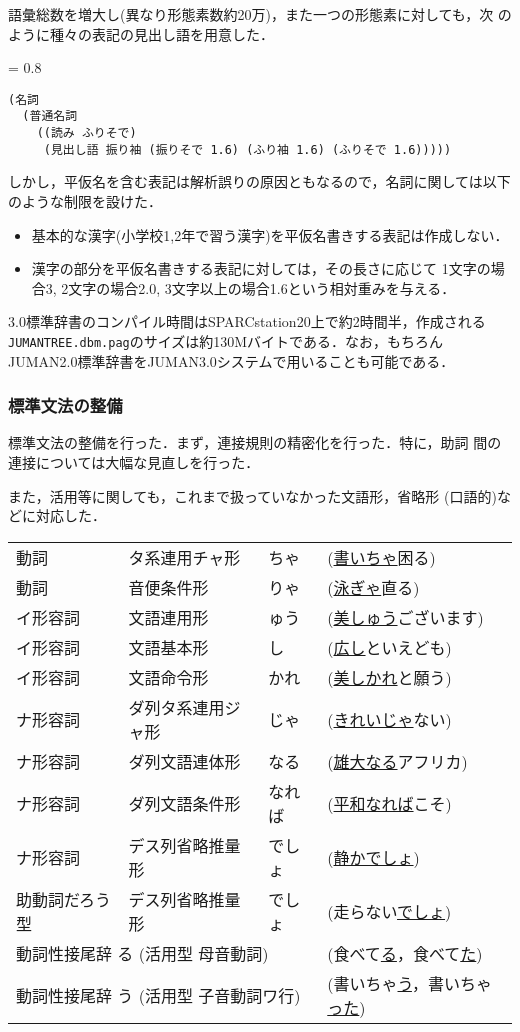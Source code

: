 \documentclass[a4j,titlepage]{jarticle}
\begin{document}
語彙総数を増大し(異なり形態素数約20万)，また一つの形態素に対しても，次
のように種々の表記の見出し語を用意した．
{\baselineskip = 0.8 \baselineskip
\begin{verbatim}
(名詞 
  (普通名詞 
    ((読み ふりそで)
     (見出し語 振り袖 (振りそで 1.6) (ふり袖 1.6) (ふりそで 1.6)))))
\end{verbatim}}

しかし，平仮名を含む表記は解析誤りの原因ともなるので，名詞に関しては以下
のような制限を設けた．
\begin{itemize}
\item 基本的な漢字(小学校1,2年で習う漢字)を平仮名書きする表記は作成しない．
\item 漢字の部分を平仮名書きする表記に対しては，その長さに応じて
  1文字の場合3, 2文字の場合2.0, 3文字以上の場合1.6という相対重みを与える．
\end{itemize}

3.0標準辞書のコンパイル時間はSPARCstation20上で約2時間半，作成される
{\tt JUMANTREE.dbm.pag}のサイズは約130Mバイトである．なお，もちろん
JUMAN2.0標準辞書をJUMAN3.0システムで用いることも可能である．

\subsubsection{標準文法の整備}

標準文法の整備を行った．まず，連接規則の精密化を行った．特に，助詞
間の連接については大幅な見直しを行った．

また，活用等に関しても，これまで扱っていなかった文語形，省略形
(口語的)などに対応した．
\begin{center}
\begin{tabular}{llll} \hline
動詞     & タ系連用チャ形 & ちゃ & (\underline{書いちゃ}困る) \\
動詞     & 音便条件形 & りゃ & (\underline{泳ぎゃ}直る) \\
イ形容詞 & 文語連用形 & ゅう & (\underline{美しゅう}ございます) \\
イ形容詞 & 文語基本形 & し & (\underline{広し}といえども) \\
イ形容詞 & 文語命令形 & かれ & (\underline{美しかれ}と願う) \\
ナ形容詞 & ダ列タ系連用ジャ形 & じゃ & (\underline{きれいじゃ}ない) \\
ナ形容詞 & ダ列文語連体形 & なる & (\underline{雄大なる}アフリカ) \\
ナ形容詞 & ダ列文語条件形 & なれば & (\underline{平和なれば}こそ) \\
ナ形容詞 & デス列省略推量形 & でしょ & (\underline{静かでしょ}) \\
助動詞だろう型  & デス列省略推量形 & でしょ & (走らない\underline{でしょ}) \\
\multicolumn{3}{l}{動詞性接尾辞 る (活用型 母音動詞)}  & (食べて\underline{る}，食べて\underline{た}) \\
\multicolumn{3}{l}{動詞性接尾辞 う (活用型 子音動詞ワ行)} & (書いちゃ\underline{う}，書いちゃ\underline{った}) \\ \hline
\end{tabular}
\end{center}
\end{document}

